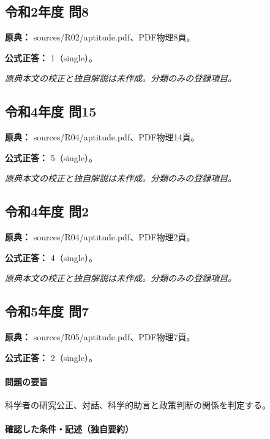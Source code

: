 \subsection{令和2年度 問8}
\label{q:r02-reg-apt-08}

\noindent\textbf{原典：} sources/R02/aptitude.pdf、PDF物理8頁。

\textbf{公式正答：} 1（single）。

\par\textit{原典本文の校正と独自解説は未作成。分類のみの登録項目。}

\subsection{令和4年度 問15}
\label{q:r04-reg-apt-15}

\noindent\textbf{原典：} sources/R04/aptitude.pdf、PDF物理14頁。

\textbf{公式正答：} 5（single）。

\par\textit{原典本文の校正と独自解説は未作成。分類のみの登録項目。}

\subsection{令和4年度 問2}
\label{q:r04-reg-apt-02}

\noindent\textbf{原典：} sources/R04/aptitude.pdf、PDF物理2頁。

\textbf{公式正答：} 4（single）。

\par\textit{原典本文の校正と独自解説は未作成。分類のみの登録項目。}

\subsection{令和5年度 問7}
\label{q:r05-reg-apt-07}

\noindent\textbf{原典：} sources/R05/aptitude.pdf、PDF物理7頁。

\textbf{公式正答：} 2（single）。

\paragraph{問題の要旨} 科学者の研究公正、対話、科学的助言と政策判断の関係を判定する。

\paragraph{確認した条件・記述（独自要約）}\mbox{}\par

